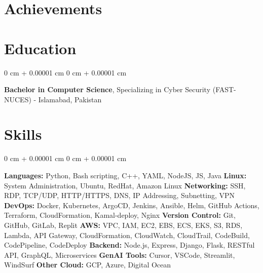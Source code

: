 \documentclass[10pt, letterpaper]{article}
\newenvironment{onecolentry}{
    \begin{adjustwidth}{
        0 cm + 0.00001 cm
    }{
        0 cm + 0.00001 cm
    }
}{
    \end{adjustwidth}
}
\newenvironment{twocolentry}[2][]{
    \onecolentry
    \def\secondColumn{#2}
    \setcolumnwidth{\fill, 4.5 cm}
    \begin{paracol}{2}
}{
    \switchcolumn \raggedleft \secondColumn
    \end{paracol}
    \endonecolentry
}
\begin{document}
\section{Achievements}

\section{Education}
\vspace{0.10 cm}
\begin{twocolentry}{}
    \textbf{Bachelor in Computer Science}, Specializing in Cyber Security (FAST-NUCES) - Islamabad, Pakistan
\end{twocolentry}

\section{Skills}
\vspace{0.10 cm}
\begin{onecolentry}
    \textbf{Languages:} Python, Bash scripting, C++, YAML, NodeJS, JS, Java
    \vspace{0.1cm}
    \textbf{Linux:} System Administration, Ubuntu, RedHat, Amazon Linux
    \vspace{0.1cm}
    \textbf{Networking:} SSH, RDP, TCP/UDP, HTTP/HTTPS, DNS, IP Addressing, Subnetting, VPN
    \vspace{0.1cm}
    \textbf{DevOps:} Docker, Kubernetes, ArgoCD, Jenkins, Ansible, Helm, GitHub Actions, Terraform, CloudFormation, Kamal-deploy, Nginx
    \vspace{0.1cm}
    \textbf{Version Control:} Git, GitHub, GitLab, Replit
    \vspace{0.1cm}
    \textbf{AWS:} VPC, IAM, EC2, EBS, ECS, EKS, S3, RDS, Lambda, API Gateway, CloudFormation, CloudWatch, CloudTrail, CodeBuild, CodePipeline, CodeDeploy
    \vspace{0.1cm}
    \textbf{Backend:} Node.js, Express, Django, Flask, RESTful API, GraphQL, Microservices
    \vspace{0.1cm}
    \textbf{GenAI Tools:} Cursor, VSCode, Streamlit, WindSurf
    \vspace{0.1cm}
    \textbf{Other Cloud:} GCP, Azure, Digital Ocean
\end{onecolentry}
\end{document}
